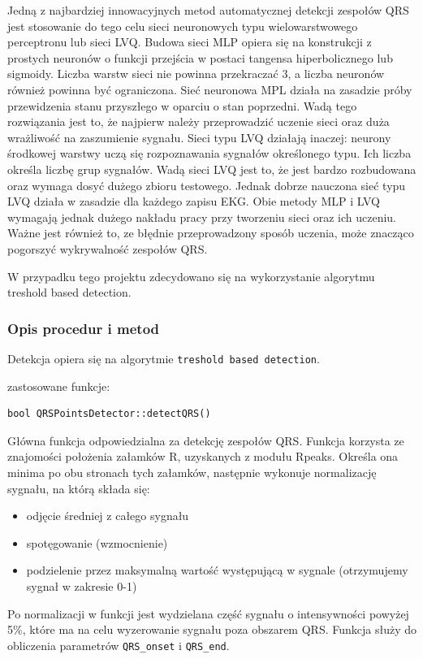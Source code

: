 \documentclass[a4paper, 11pt]{article}
\begin{document}
Jedną z najbardziej innowacyjnych metod automatycznej detekcji zespołów QRS
jest stosowanie do tego celu sieci neuronowych typu wielowarstwowego
perceptronu lub sieci LVQ. Budowa sieci MLP opiera się na konstrukcji z prostych neuronów o funkcji przejścia w postaci
tangensa hiperbolicznego lub sigmoidy. Liczba warstw sieci nie powinna
przekraczać 3, a liczba neuronów również powinna być ograniczona. 
Sieć neuronowa MPL działa na zasadzie próby przewidzenia stanu
przyszłego w oparciu o stan poprzedni. Wadą tego rozwiązania jest to, że najpierw należy przeprowadzić uczenie sieci oraz duża wrażliwość na zaszumienie sygnału.  Sieci typu LVQ działają inaczej: neurony środkowej warstwy uczą się rozpoznawania
sygnałów określonego typu. Ich liczba określa liczbę grup sygnałów.
Wadą sieci LVQ jest to, że jest bardzo rozbudowana oraz
wymaga dosyć dużego zbioru testowego. Jednak dobrze nauczona sieć typu LVQ działa w zasadzie dla każdego zapisu EKG.
Obie metody MLP i LVQ wymagają jednak
dużego nakładu pracy przy tworzeniu sieci oraz ich uczeniu. Ważne jest również to, ze błędnie przeprowadzony sposób uczenia, może znacząco pogorszyć wykrywalność zespołów QRS.

W przypadku tego projektu zdecydowano się na wykorzystanie algorytmu treshold based detection.


\subsubsection{Opis procedur i metod}
\label{sec:waves:procs}
Detekcja opiera się na algorytmie \verb|treshold based detection|.


zastosowane funkcje:


\begin{lstlisting}
bool QRSPointsDetector::detectQRS()
\end{lstlisting}
Główna funkcja odpowiedzialna za detekcję zespołów QRS. Funkcja korzysta ze znajomości położenia
załamków R, uzyskanych z modułu Rpeaks. Określa ona minima po obu stronach tych załamków,
następnie wykonuje normalizację sygnału, na którą składa się:
\begin{itemize}
     \item odjęcie średniej z całego sygnału
     \item spotęgowanie (wzmocnienie)
     \item podzielenie przez maksymalną wartość występującą w sygnale (otrzymujemy sygnał
w zakresie 0-1)
\end{itemize}

Po normalizacji w funkcji jest wydzielana część sygnału o intensywności powyżej 5\%, które ma na
celu wyzerowanie sygnału poza obszarem QRS. Funkcja służy do obliczenia parametrów \verb|QRS_onset| i
\verb|QRS_end|.
\end{document}

